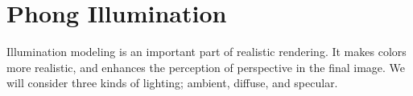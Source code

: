 \section{Phong Illumination}
Illumination modeling is an important part of realistic rendering. It makes
colors more realistic, and enhances the perception of perspective in the final
image.
We will consider three kinds of lighting; ambient, diffuse, and specular.




